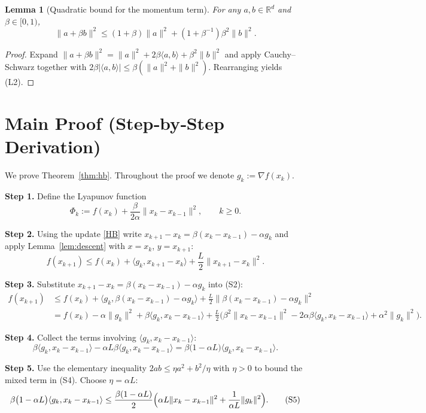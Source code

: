 \documentclass{article}
\newtheorem{lemma}{Lemma}
\newcommand{\R}{\mathbb{R}}
\begin{document}
\begin{lemma}[Quadratic bound for the momentum term]\label{lem:beta}
For any $a,b\in\R^{d}$ and $\beta\in[0,1)$,
\[
\|a+\beta b\|^{2}\le (1+\beta)\|a\|^{2}+(1+\beta^{-1})\beta^{2}\|b\|^{2}.
\tag{L2}
\]
\end{lemma}
\begin{proof}
Expand $\|a+\beta b\|^{2}= \|a\|^{2}+2\beta\langle a,b\rangle+\beta^{2}\|b\|^{2}$ and apply Cauchy–Schwarz together with $2\beta|\langle a,b\rangle|\le \beta(\|a\|^{2}+\|b\|^{2})$. Rearranging yields (L2). \qedhere
\end{proof}

\section*{Main Proof (Step‑by‑Step Derivation)}
We prove Theorem~\ref{thm:hb}. Throughout the proof we denote $g_{k}:=\nabla f(x_{k})$.

\bigskip
\noindent\textbf{Step 1.} Define the Lyapunov function
\[
\Phi_{k}:=f(x_{k})+\frac{\beta}{2\alpha}\|x_{k}-x_{k-1}\|^{2},\qquad k\ge0.
\tag{S1}
\]

\noindent\textbf{Step 2.} Using the update \eqref{HB} write $x_{k+1}-x_{k}= \beta (x_{k}-x_{k-1})-\alpha g_{k}$ and apply Lemma~\ref{lem:descent} with $x=x_{k}$, $y=x_{k+1}$:
\[
f(x_{k+1})\le f(x_{k})+\langle g_{k},x_{k+1}-x_{k}\rangle
+\frac{L}{2}\|x_{k+1}-x_{k}\|^{2}.
\tag{S2}
\]

\noindent\textbf{Step 3.} Substitute $x_{k+1}-x_{k}= \beta (x_{k}-x_{k-1})-\alpha g_{k}$ into (S2):
\[
\begin{aligned}
f(x_{k+1})
&\le f(x_{k})+\langle g_{k},\beta (x_{k}-x_{k-1})-\alpha g_{k}\rangle
+\frac{L}{2}\|\beta (x_{k}-x_{k-1})-\alpha g_{k}\|^{2}\\
&= f(x_{k})-\alpha\|g_{k}\|^{2}
+\beta\langle g_{k},x_{k}-x_{k-1}\rangle
+\frac{L}{2}\bigl(\beta^{2}\|x_{k}-x_{k-1}\|^{2}
-2\alpha\beta\langle g_{k},x_{k}-x_{k-1}\rangle
+\alpha^{2}\|g_{k}\|^{2}\bigr).
\end{aligned}
\tag{S3}
\]

\noindent\textbf{Step 4.} Collect the terms involving $\langle g_{k},x_{k}-x_{k-1}\rangle$:
\[
\beta\langle g_{k},x_{k}-x_{k-1}\rangle
-\alpha L\beta\langle g_{k},x_{k}-x_{k-1}\rangle
= \beta\bigl(1-\alpha L\bigr)\langle g_{k},x_{k}-x_{k-1}\rangle.
\tag{S4}
\]

\noindent\textbf{Step 5.} Use the elementary inequality $2ab\le \eta a^{2}+b^{2}/\eta$ with $\eta>0$ to bound the mixed term in (S4). Choose $\eta=\alpha L$:
\[
\beta\bigl(1-\alpha L\bigr)\langle g_{k},x_{k}-x_{k-1}\rangle
\le \frac{\beta(1-\alpha L)}{2}\Bigl(\alpha L\|x_{k}-x_{k-1}\|^{2}
+\frac{1}{\alpha L}\|g_{k}\|^{2}\Bigr).
\tag{S5}
\]
\end{document}
